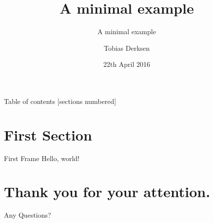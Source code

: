\documentclass{beamer}
\title{A minimal example}
\subtitle{A minimal example}
\date{22th April 2016}
\author{Tobias Derksen}
\institute{Fontys School of Technology \& Logistics}
\begin{document}
  \maketitle

  \begin{frame}{Table of contents}
    [sections numbered]
    \tableofcontents[hideallsubsections]
  \end{frame}


  \section{First Section}
  \begin{frame}{First Frame}
    Hello, world!
  \end{frame}
  
  
  
  
	\section{Thank you for your attention.}
	\begin{frame}[standout]
		Any Questions?
	\end{frame}
\end{document}
